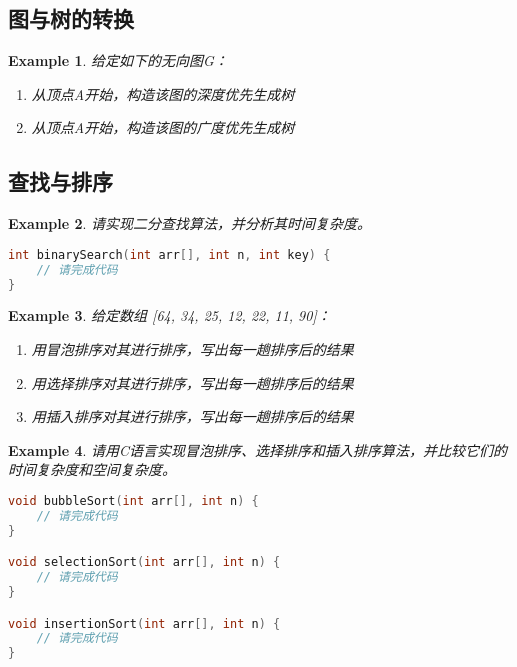 \documentclass{../../note}
\newtheorem{example}{Example}
\begin{document}
\subsection{图与树的转换}

\begin{example}
给定如下的无向图G：
\begin{center}
\end{center}

\begin{enumerate}
  \item 从顶点A开始，构造该图的深度优先生成树
  \item 从顶点A开始，构造该图的广度优先生成树
\end{enumerate}
\end{example}

\subsection{查找与排序}

\begin{example}
请实现二分查找算法，并分析其时间复杂度。
\begin{lstlisting}[language=C]
int binarySearch(int arr[], int n, int key) {
    // 请完成代码
}
\end{lstlisting}
\end{example}

\begin{example}
给定数组 [64, 34, 25, 12, 22, 11, 90]：
\begin{enumerate}
  \item 用冒泡排序对其进行排序，写出每一趟排序后的结果
  \item 用选择排序对其进行排序，写出每一趟排序后的结果
  \item 用插入排序对其进行排序，写出每一趟排序后的结果
\end{enumerate}
\end{example}

\begin{example}
请用C语言实现冒泡排序、选择排序和插入排序算法，并比较它们的时间复杂度和空间复杂度。
\begin{lstlisting}[language=C]
void bubbleSort(int arr[], int n) {
    // 请完成代码
}

void selectionSort(int arr[], int n) {
    // 请完成代码
}

void insertionSort(int arr[], int n) {
    // 请完成代码
}
\end{lstlisting}
\end{example}
\end{document}
